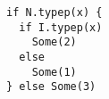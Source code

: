 \begin{lstlisting}[style=scalaioScala]
if N.typep(x) {
  if I.typep(x)
    Some(2)
  else
    Some(1)
} else Some(3)
\end{lstlisting}
